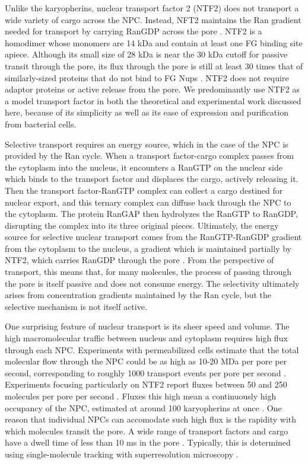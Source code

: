 Unlike the karyopherins, nuclear transport factor 2 (NTF2) does not transport a wide variety of cargo across the NPC.  Instead, NFT2 maintains the Ran gradient needed for transport by carrying RanGDP across the pore \cite{ribbeck98,bayliss99}.  NTF2 is a homodimer whose monomers are 14 kDa and contain at least one FG binding site apiece.  Although its small size of 28 kDa is near the 30 kDa cutoff for passive transit through the pore, its flux through the pore is still at least 30 times that of similarly-sized proteins that do not bind to FG Nups \cite{ribbeck01,siebrasse02,kiskin03}.  NTF2 does not require adaptor proteins or active release from the pore. We predominantly use NTF2 as a model transport factor in both the theoretical and experimental work discussed here, because of its simplicity as well as its ease of expression and purification from bacterial cells.

Selective transport requires an energy source, which in the case of the NPC is provided by the Ran cycle.  When a transport factor-cargo complex passes from the cytoplasm into the nucleus, it encounters a RanGTP on the nuclear side which binds to the transport factor and displaces the cargo, actively releasing it.  Then the transport factor-RanGTP complex can collect a cargo destined for nuclear export, and this ternary complex can diffuse back through the NPC to the cytoplasm.  The protein RanGAP then hydrolyzes the RanGTP to RanGDP, disrupting the complex into its three original pieces.  Ultimately, the energy source for selective nuclear transport comes from the RanGTP-RanGDP gradient from the cytoplasm to the nucleus, a gradient which is maintained partially by NTF2, which carries RanGDP through the pore \cite{jovanovic-talisman17,stanley17}.  From the perspective of transport, this means that, for many molecules, the process of passing through the pore is itself passive and does not consume energy.  The selectivity ultimately arises from concentration gradients maintained by the Ran cycle, but the selective mechanism is not itself active.

One surprising feature of nuclear transport is its sheer speed and volume.  The high macromolecular traffic between nucleus and cytoplasm requires high flux through each NPC.  Experiments with permeabilized cells estimate that the total molecular flow through the NPC could be as high as 10-20 MDa per pore per second, corresponding to roughly 1000 transport events per pore per second \cite{ribbeck01}.  Experiments focusing particularly on NTF2 report fluxes between 50 and 250 molecules per pore per second \cite{ribbeck01, siebrasse02, kiskin03}.  Fluxes this high mean a continuously high occupancy of the NPC, estimated at around 100 karyopherins at once \cite{paradise07}. One reason that individual NPCs can accomodate such high flux is the rapidity with which molecules transit the pore.  A wide range of transport factors and cargo have a dwell time of less than 10 ms in the pore \cite{tu11, yang06, dange08, kubitscheck05}.  Typically, this is determined using single-molecule tracking with superresolution microscopy \cite{tu11}.


